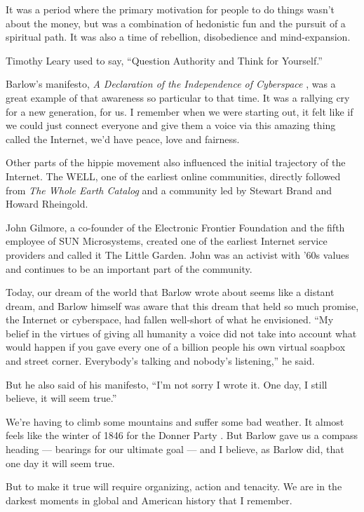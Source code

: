 It was a period where the primary motivation for people to do things wasn't about the money, but was a combination of hedonistic fun and the pursuit of a spiritual path. It was also a time of rebellion, disobedience and mind-expansion.
 
Timothy Leary used to say, ``Question Authority and Think for Yourself.''
 
Barlow's manifesto, \emph{A Declaration of the Independence of Cyberspace} \cite{barlow1996declaration}, was a great example of that awareness so particular to that time. It was a rallying cry for a new generation, for us. I remember when we were starting out, it felt like if we could just connect everyone and give them a voice via this amazing thing called the Internet, we'd have peace, love and fairness.

Other parts of the hippie movement also influenced the initial trajectory of the Internet. The WELL, one of the earliest online communities, directly followed from \emph{The Whole Earth Catalog} \cite{brand1981whole} and a community led by Stewart Brand and Howard Rheingold.

John Gilmore, a co-founder of the Electronic Frontier Foundation and the fifth employee of SUN Microsystems, created one of the earliest Internet service providers and called it The Little Garden. John was an activist with '60s values and continues to be an important part of the community.
 
Today, our dream of the world that Barlow wrote about seems like a distant dream, and Barlow himself was aware that this dream that held so much promise, the Internet or cyberspace, had fallen well-short of what he envisioned. ``My belief in the virtues of giving all humanity a voice did not take into account what would happen if you gave every one of a billion people his own virtual soapbox and street corner. Everybody's talking and nobody's listening,'' he said.

But he also said of his manifesto, ``I'm not sorry I wrote it. One day, I still believe, it will seem true.''
 
We're having to climb some mountains and suffer some bad weather. It almost feels like the winter of 1846 for the Donner Party \cite{stewart1960ordeal}. But Barlow gave us a compass heading --- bearings for our ultimate goal --- and I believe, as Barlow did, that one day it will seem true. 

But to make it true will require organizing, action and tenacity. We are in the darkest moments in global and American history that I remember.
 
